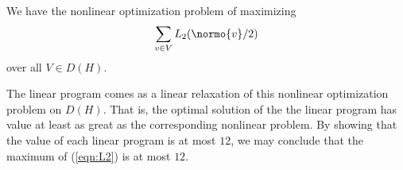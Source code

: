 We have the nonlinear optimization problem of maximizing
\begin{equation}\label{eqn:L2}
\sum_{v\in V} L_2(\normo{v}/2)
\end{equation}
over all $V\in D(H)$.

The linear program comes as a linear relaxation of this nonlinear
optimization problem on $D(H)$. That is, the optimal solution of the
the linear program has value at least as great as the corresponding
nonlinear problem.  By showing that the value of each linear program
is at most $12$, we may conclude that the maximum of (\ref{eqn:L2})
is at most $12$.


